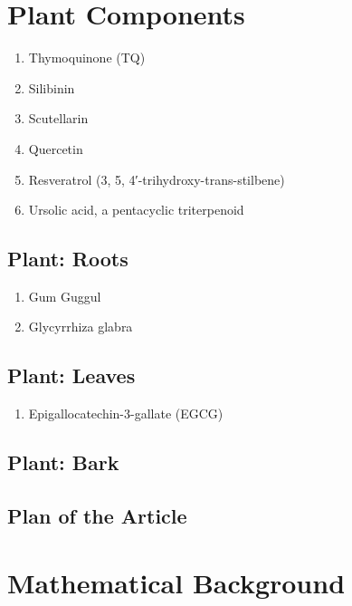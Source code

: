 \section{Plant Components}

\begin{enumerate}
\item Thymoquinone (TQ)
\item Silibinin
\item Scutellarin 
\item Quercetin
\item Resveratrol (3, 5, 4′-trihydroxy-trans-stilbene)
\item Ursolic acid, a pentacyclic triterpenoid
\end{enumerate}

\subsection{Plant: Roots}

\begin{enumerate}
\item Gum Guggul
\item Glycyrrhiza glabra
\end{enumerate}


\subsection{Plant: Leaves}

\begin{enumerate}
\item Epigallocatechin-3-gallate (EGCG)
\end{enumerate}


\subsection{Plant: Bark}

\begin{enumerate}
\end{enumerate}


\subsection{Plan of the Article}

\begin{enumerate}
\end{enumerate}



\section{Mathematical Background}


